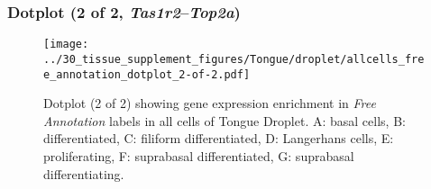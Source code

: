 \clearpage

\subsubsection{Dotplot (2 of 2, \emph{Tas1r2}--\emph{Top2a})}
\begin{figure}[h]
\centering
\texttt{[image: ../30\_tissue\_supplement\_figures/Tongue/droplet/allcells\_free\_annotation\_dotplot\_2-of-2.pdf]}

\caption{ Dotplot (2 of 2)  showing gene expression enrichment in \emph{Free Annotation} labels in all cells of Tongue Droplet. A: basal cells, B: differentiated, C: filiform differentiated, D: Langerhans cells, E: proliferating, F: suprabasal differentiated, G: suprabasal differentiating.}
\end{figure}

